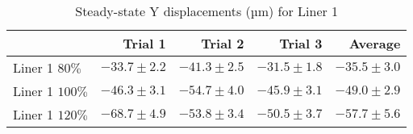 \begin{table}[htbp!]
\centering
\begin{tabular}{lrrrr}
\toprule
  & Trial 1 & Trial 2 & Trial 3 & Average \\
\midrule
 Liner 1 $80\%$ & $-33.7 \pm 2.2$ & $-41.3 \pm 2.5$ & $-31.5 \pm 1.8$ & $-35.5 \pm 3.0$ \\
 Liner 1 $100\%$ & $-46.3 \pm 3.1$ & $-54.7 \pm 4.0$ & $-45.9 \pm 3.1$ & $-49.0 \pm 2.9$ \\
 Liner 1 $120\%$ & $-68.7 \pm 4.9$ & $-53.8 \pm 3.4$ & $-50.5 \pm 3.7$ & $-57.7 \pm 5.6$ \\
\bottomrule
\end{tabular}
\caption{Steady-state Y displacements (µm) for Liner 1}
\label{fig:liner_1_results_table}
\end{table}
